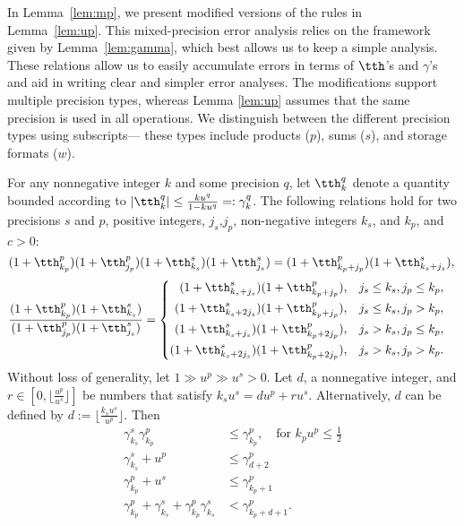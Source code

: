 In Lemma~\ref{lem:mp}, we present modified versions of the rules in Lemma~\ref{lem:up}.
This mixed-precision error analysis relies on the framework given by Lemma~\ref{lem:gamma}, which best allows us to keep a simple analysis. 
These relations allow us to easily accumulate errors in terms of $\tth$'s and $\gamma$'s and aid in writing clear and simpler error analyses.
The modifications support multiple precision types, whereas Lemma \ref{lem:up} assumes that the same precision is used in all operations. 
We distinguish between the different precision types using subscripts--- these types include products ($p$), sums ($s$), and storage formats ($w$).

\begin{lemma}%
	\label{lem:mp}
	For any nonnegative integer $k$ and some precision $q$, let $\tth^{q}_{k}$ denote a quantity bounded according to $|\tth^{q}_{k}|\leq \frac{k u^{q} }{1-ku^{q}} =:\gamma^{q}_{k}$.
	The following relations hold for two precisions $s$ and $p$, positive integers, $j_s$,$j_p$, non-negative integers $k_s$, and $k_p$, and $c>0$:
	\begin{equation}
	(1+\tth^{p}_{k_p})(1+\tth^{p}_{j_p})(1+\tth^{s}_{k_s})(1+\tth^{s}_{j_s})=(1+\tth^{p}_{k_p+j_p})(1+\tth^{s}_{k_s+j_s}), \\
	\end{equation}
	\begin{align}
	\frac{(1+\tth^{p}_{k_p})(1+\tth^{s}_{k_s})}{(1+\tth^{p}_{j_p})(1+\tth^{s}_{j_s})} &=\left\{\begin{alignedat}{2}
	(1+\tth^{s}_{k_s+j_s})(1+\tth^{p}_{k_p+j_p})&,\quad& j_s \leq k_s, j_p \leq k_p,\\
	(1+\tth^{s}_{k_s+2j_s})(1+\tth^{p}_{k_p+j_p})&,\quad& j_s \leq k_s, j_p > k_p,\\
	(1+\tth^{s}_{k_s+j_s})(1+\tth^{p}_{k_p+2j_p})&,\quad& j_s > k_s, j_p \leq k_p,\\
	(1+\tth^{s}_{k_s+2j_s})(1+\tth^{p}_{k_p+2j_p})&,\quad& j_s > k_s, j_p > k_p.
	\end{alignedat}\right.
	\end{align}
	Without loss of generality, let $1 \gg u^{p} \gg u^{s}>0$.
	Let $d$, a nonnegative integer, and $r\in[0, \lfloor\frac{u^{p}}{u^{s}}\rfloor]$ be numbers that satisfy $k_su^{s} = d u^{p} + r u^{s}$. 
	Alternatively, $d$ can be defined by $d := \lfloor\frac{k_su^{s}}{u^{p}}\rfloor$.
	Then
	\begin{align}
	\gamma^{s}_{k_s}\gamma^{p}_{k_p} &\leq \gamma^{p}_{k_p}, \quad\text{for } k_p u^{p} \leq \frac{1}{2}  \\
	\gamma^{s}_{k_s}+u^{p} &\leq \gamma^{p}_{d+2} \\
	\gamma^{p}_{k_p} + u^{s} &\leq \gamma^{p}_{k_p+1} \\ %
	\gamma^{p}_{k_p}+\gamma^{s}_{k_s}+\gamma^{p}_{k_p}\gamma^{s}_{k_s} & < \gamma^{p}_{k_p+ d+ 1}. \label{lem:mp1}
	\end{align} 
\end{lemma}
